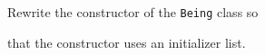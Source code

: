 Rewrite the constructor of the \texttt{Being} class so

that the constructor uses an initializer list.

